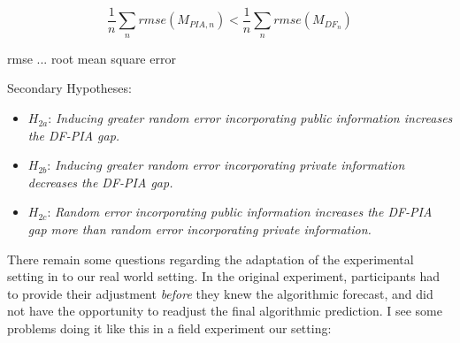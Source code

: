 \documentclass[12pt,a4paper]{article}
\begin{document}
\[ \frac{1}{n}\sum_{n} rmse(M_{PIA, n}) < \frac{1}{n}\sum_{n} rmse(M_{DF_n})\]


rmse ... root mean square error

Secondary Hypotheses: 

\begin{itemize}

	\item $H_{2a}$: \emph{Inducing greater random error incorporating public information increases the DF-PIA gap.}
	\item $H_{2b}$: \emph{Inducing greater random error incorporating private information decreases the DF-PIA gap.}
	\item $H_{2c}$: \emph{Random error incorporating public information increases the DF-PIA gap more than random error incorporating private information.}

\end{itemize}

There remain some questions regarding the adaptation of the experimental setting in \citep{ibrahim2021eliciting} to our real world setting. In the original experiment, participants had to provide their adjustment \emph{before} they knew the algorithmic forecast, and did not have the opportunity to readjust the final algorithmic prediction. I see some problems doing it like this in a field experiment our setting:
\end{document}
